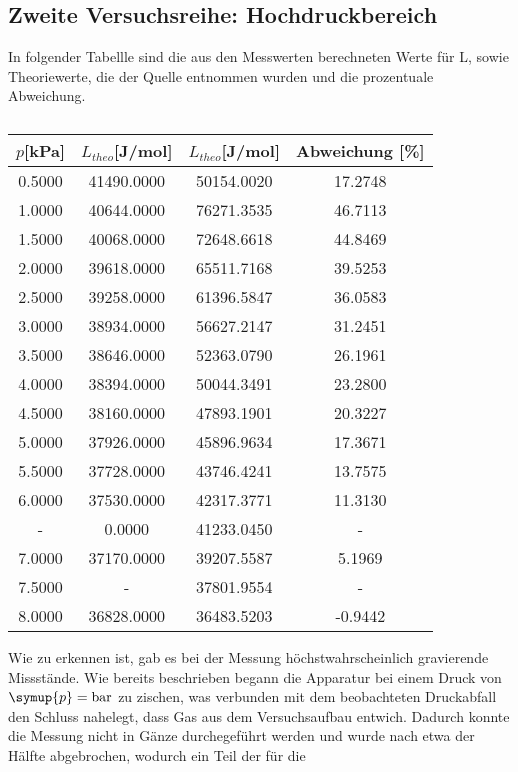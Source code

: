 \subsection{Zweite Versuchsreihe: Hochdruckbereich}
In folgender Tabellle sind die aus den Messwerten berechneten Werte für L, sowie Theoriewerte, die der
Quelle \cite{Dampfdrucktabelle} entnommen wurden und die prozentuale Abweichung.
\begin{table}[H]
\centering
   \caption{}
   \label{tab:hdr}
   \begin{tabular}{c c c c}
   \toprule
     $p$[kPa] & $L_{theo}$[J/mol] & $L_{theo}$[J/mol] & Abweichung [\%] \\
    \midrule
      0.5000 & 41490.0000 & 50154.0020 &    17.2748 \\     1.0000 & 40644.0000 & 76271.3535 &    46.7113 \\     1.5000 & 40068.0000 & 72648.6618 &    44.8469 \\     2.0000 & 39618.0000 & 65511.7168 &    39.5253 \\     2.5000 & 39258.0000 & 61396.5847 &    36.0583 \\     3.0000 & 38934.0000 & 56627.2147 &    31.2451 \\     3.5000 & 38646.0000 & 52363.0790 &    26.1961 \\     4.0000 & 38394.0000 & 50044.3491 &    23.2800 \\     4.5000 & 38160.0000 & 47893.1901 &    20.3227 \\     5.0000 & 37926.0000 & 45896.9634 &    17.3671 \\     5.5000 & 37728.0000 & 43746.4241 &    13.7575 \\     6.0000 & 37530.0000 & 42317.3771 &    11.3130 \\     - &     0.0000 & 41233.0450 &   - \\     7.0000 & 37170.0000 & 39207.5587 &     5.1969 \\     7.5000 &     - & 37801.9554 &   - \\     8.0000 & 36828.0000 & 36483.5203 &    -0.9442 \\ 
    \bottomrule
    \end{tabular}
\end{table}
Wie zu erkennen ist, gab es bei der Messung höchstwahrscheinlich gravierende Missstände.
Wie bereits beschrieben begann die Apparatur bei einem Druck von $\symup{p} = \si{\bar}$ zu zischen, was verbunden mit dem beobachteten Druckabfall den Schluss nahelegt, dass
Gas aus dem Versuchsaufbau entwich. Dadurch konnte die Messung nicht in Gänze durchegeführt werden und wurde nach etwa der Hälfte abgebrochen, wodurch ein Teil der für die 

